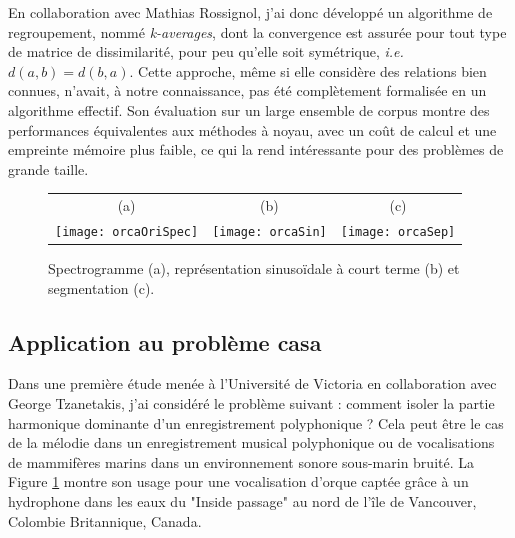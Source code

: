 En collaboration avec Mathias Rossignol, j'ai donc développé un algorithme de regroupement, nommé \textsl{k-averages}, dont la convergence est assurée pour tout type de matrice de dissimilarité, pour peu qu'elle soit symétrique, \textit{i.e.} $d(a, b) = d(b,a)$. Cette approche, même si elle considère des relations bien connues, n'avait, à notre connaissance, pas été complètement formalisée  en un algorithme effectif. Son évaluation sur un large ensemble de corpus\cite{UCRArchive} montre des performances équivalentes aux méthodes à noyau, avec un coût de calcul et une empreinte mémoire plus faible, ce qui la rend intéressante pour des problèmes de grande taille.~\cite{rossignol2018efficient}

\begin{figure}[t]
  \footnotesize
  \begin{tabular}{ccc}
    (a) & (b) & (c)  \\
  \texttt{[image: orcaOriSpec]} &
  \texttt{[image: orcaSin]} &
  \texttt{[image: orcaSep]} \\
\end{tabular}
  \label{fig:orca}
  \caption{Spectrogramme (a), représentation sinusoïdale à court terme (b) et segmentation (c).}
\end{figure}

\subsection{Application au problème casa}


Dans une première étude menée à l'Université de Victoria en collaboration avec George Tzanetakis, j'ai considéré le problème suivant : comment isoler la partie harmonique dominante d'un enregistrement polyphonique ? Cela peut être le cas de la mélodie dans un enregistrement musical polyphonique ou de vocalisations de mammifères marins dans un environnement sonore sous-marin bruité. La Figure \ref{fig:orca} montre son usage pour une vocalisation d'orque captée grâce à un hydrophone dans les eaux du "Inside passage" au nord de l'île de Vancouver, Colombie Britannique, Canada.

